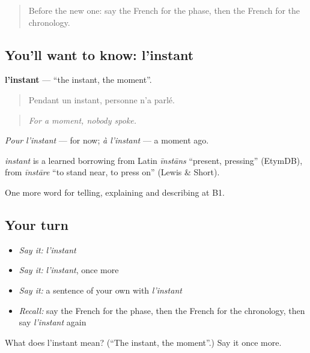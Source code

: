 \begin{quote}
Before the new one: say the French for the phase, then the French for the chronology.
\end{quote}

\subsection*{You'll want to know: l'instant}
\textbf{l'instant} — \textquotedblleft{}the instant, the moment\textquotedblright{}.

\begin{quote}
Pendant un instant, personne n'a parlé.
\end{quote}

\begin{quote}
\emph{For a moment, nobody spoke.}
\end{quote}

\emph{Pour l'instant} — for now; \emph{à l'instant} — a moment ago.

\begin{cousinweb}
\emph{instant} is a learned borrowing from Latin \emph{īnstāns} \textquotedblleft{}present, pressing\textquotedblright{} (EtymDB), from \emph{īnstāre} \textquotedblleft{}to stand near, to press on\textquotedblright{} (Lewis \& Short).
\end{cousinweb}

\begin{grammarlens}[title={What you've built}]
One more word for telling, explaining and describing at B1.
\end{grammarlens}

\subsection*{Your turn}
\begin{itemize}
\raggedright
  \item \emph{Say it:} \emph{l'instant}
  \item \emph{Say it:} \emph{l'instant}, once more
  \item \emph{Say it:} a sentence of your own with \emph{l'instant}
  \item \emph{Recall:} say the French for the phase, then the French for the chronology, then say \emph{l'instant} again
\end{itemize}

\begin{tcolorbox}[breakable,colback=teal!4,colframe=teal!35!black,title={Before you move on}]
What does l'instant mean? (\textquotedblleft{}The instant, the moment\textquotedblright{}.) Say it once more.
\end{tcolorbox}
